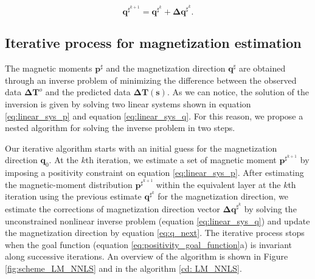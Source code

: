 \begin{equation}
\mathbf{q}^{\sharp^{k+1}} = \mathbf{q}^{\sharp^k} + \mathbf{\Delta q}^{\sharp^k}.
\label{eq:q_next}
\end{equation}

\subsection{Iterative process for magnetization estimation}

The magnetic moments $\mathbf{p}^{\sharp}$ and the magnetization direction $\mathbf{q}^{\sharp}$ are obtained through an inverse problem of minimizing the difference between the observed data $ \mathbf{\Delta T}^o $ and the predicted data $\mathbf{\Delta T} (\mathbf{s})$. As we can notice, the solution of the inversion is given by solving two linear systems shown in equation \ref{eq:linear_sys_p} and equation \ref{eq:linear_sys_q}. For this reason, we propose a nested algorithm for solving the inverse problem in two steps.           

Our iterative algorithm starts with an initial guess for the magnetization direction $\mathbf{q}_0$. At the $k$th iteration, we estimate a set of magnetic moment $\mathbf{p}^{\sharp^{k+1}}$ by imposing a positivity constraint on equation \ref{eq:linear_sys_p}. After estimating the magnetic-moment distribution $\mathbf{p}^{\sharp^{k+1}}$ within the equivalent layer at the $k$th iteration using the previous estimate $\mathbf{q}^{\sharp^k}$ for the magnetization direction, we estimate the corrections of magnetization direction vector $\mathbf{\Delta q}^{\sharp^k}$ by solving the unconstrained nonlinear inverse problem (equation \ref{eq:linear_sys_q}) and update the magnetization direction by equation \ref{eq:q_next}. The iterative process stops when the goal function (equation \ref{eq:positivity_goal_function}a) is invariant along successive iterations. An overview of the algorithm is shown in Figure \ref{fig:scheme_LM_NNLS} and in the algorithm \ref{cd: LM_NNLS}. 

